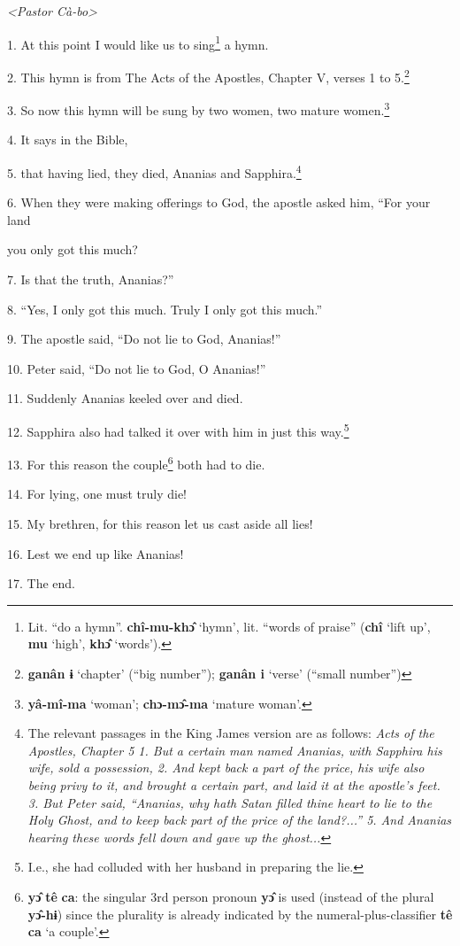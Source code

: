 \setcounter{footnote}{0}

\textit{<Pastor Cà-bo> }

1. At this point I would like us to sing\footnote{Lit. ``do a hymn''. \textbf{chî-mu-khɔ̂} `hymn', lit. ``words of praise'' (\textbf{chî} `lift up', \textbf{mu} `high', \textbf{khɔ̂} `words').} a hymn.

2. This hymn is from The Acts of the Apostles, Chapter V, verses 1 to 5.\footnote{\textbf{ganân ɨ} `chapter' (``big number''); \textbf{ganân i} `verse' (``small number'')}

3. So now this hymn will be sung by two women, two mature women.\footnote{\textbf{yâ-mî-ma} `woman'; \textbf{chɔ-mɔ̂-ma} `mature woman'.}

\textit{}

4. It says in the Bible,

5. that having lied, they died, Ananias and Sapphira.\footnote{The relevant passages in the King James version are as follows: \textit{Acts of the Apostles, Chapter 5 1. But a certain man named Ananias, with Sapphira his wife, sold a possession, 2. And kept back a part of the price, his wife also being privy to it, and brought a certain part, and laid it at the apostle's feet. 3. But Peter said, ``Ananias, why hath Satan filled thine heart to lie to the Holy Ghost, and to keep back part of the price of the land?...'' 5. And Ananias hearing these words fell down and gave up the ghost...}}

6. When they were making offerings to God, the apostle asked him, ``For your land


you only got this much?

7. Is that the truth, Ananias?''

8. ``Yes, I only got this much. Truly I only got this much.''

9. The apostle said, ``Do not lie to God, Ananias!''

10. Peter said, ``Do not lie to God, O Ananias!''

11. Suddenly Ananias keeled over and died.

12. Sapphira also had talked it over with him in just this way.\footnote{I.e., she had colluded with her husband in preparing the lie.}

13. For this reason the couple\footnote{\textbf{yɔ̂} \textbf{tê} \textbf{ca}: the singular 3rd person pronoun \textbf{yɔ̂} is used (instead of the plural \textbf{yɔ̂-hɨ}) since the plurality is already indicated by the numeral-plus-classifier \textbf{tê} \textbf{ca} `a couple'.} both had to die.

14. For lying, one must truly die!

15. My brethren, for this reason let us cast aside all lies!

16. Lest we end up like Ananias!

17. The end.

